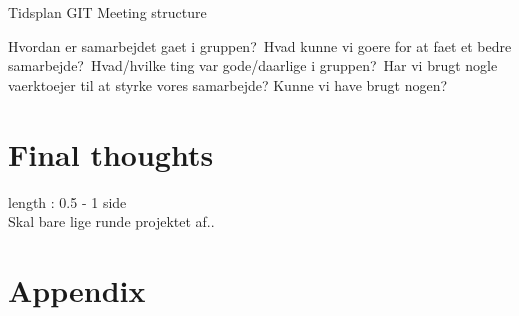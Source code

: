 \documentclass[a4paper,10pt,titlepage]{article}
\begin{document}
		Tidsplan
		GIT
		Meeting structure
		
		Hvordan er samarbejdet gaet i gruppen?\
		Hvad kunne vi goere for at faet et bedre samarbejde?\
		Hvad/hvilke ting var gode/daarlige i gruppen?\
		Har vi brugt nogle vaerktoejer til at styrke vores samarbejde? Kunne vi have brugt nogen?\
		
	
	\section{Final thoughts}
		length : 0.5 - 1 side\\
		Skal bare lige runde projektet af..
	
	\section{Appendix}
		
		
\end{document}
